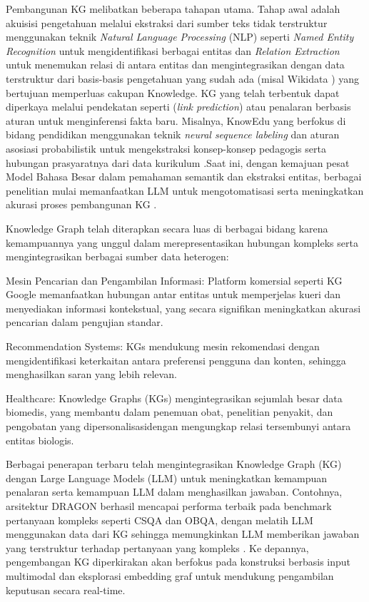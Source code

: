Pembangunan KG melibatkan beberapa tahapan utama. Tahap awal adalah akuisisi pengetahuan melalui ekstraksi dari sumber teks tidak terstruktur menggunakan teknik \textit{Natural Language Processing} (NLP) seperti \textit{Named Entity Recognition} untuk mengidentifikasi berbagai entitas dan \textit{Relation Extraction} untuk menemukan relasi di antara entitas dan mengintegrasikan dengan data terstruktur dari basis-basis pengetahuan yang sudah ada (misal Wikidata \cite{wikidata}) yang bertujuan memperluas cakupan Knowledge. KG yang telah terbentuk dapat diperkaya melalui pendekatan seperti (\textit{link prediction}) atau penalaran berbasis aturan untuk menginferensi fakta baru. Misalnya, KnowEdu yang berfokus di bidang pendidikan menggunakan teknik \textit{neural sequence labeling} dan aturan asosiasi probabilistik untuk mengekstraksi konsep-konsep pedagogis serta hubungan prasyaratnya dari data kurikulum \cite{knowedu}.Saat ini, dengan kemajuan pesat Model Bahasa Besar dalam pemahaman semantik dan ekstraksi entitas, berbagai penelitian mulai memanfaatkan LLM untuk mengotomatisasi serta meningkatkan akurasi proses pembangunan KG \cite{edge2025localglobalgraphrag}.
		
Knowledge Graph telah diterapkan secara luas di berbagai bidang karena kemampuannya yang unggul dalam merepresentasikan hubungan kompleks serta mengintegrasikan berbagai sumber data heterogen:  
\begin{daftar}
	\item Mesin Pencarian dan Pengambilan Informasi: Platform komersial seperti KG Google memanfaatkan hubungan antar entitas untuk memperjelas kueri dan menyediakan informasi kontekstual, yang secara signifikan meningkatkan akurasi pencarian dalam pengujian standar.  
	\item Recommendation Systems: KGs mendukung mesin rekomendasi dengan mengidentifikasi keterkaitan antara preferensi pengguna dan konten, sehingga menghasilkan saran yang lebih relevan.
	\item Healthcare: Knowledge Graphs (KGs) mengintegrasikan sejumlah besar data biomedis, yang membantu dalam penemuan obat, penelitian penyakit, dan pengobatan yang dipersonalisasidengan mengungkap relasi tersembunyi antara entitas biologis.
\end{daftar}

Berbagai penerapan terbaru telah mengintegrasikan Knowledge Graph (KG) dengan Large Language Models (LLM) untuk meningkatkan kemampuan penalaran serta kemampuan LLM dalam menghasilkan jawaban. Contohnya, arsitektur DRAGON \cite{yasunaga2022deepbidirectionallanguageknowledgegraph} berhasil mencapai performa terbaik pada benchmark pertanyaan kompleks seperti CSQA dan OBQA, dengan melatih LLM menggunakan data dari KG sehingga memungkinkan LLM memberikan jawaban yang terstruktur terhadap pertanyaan yang kompleks \cite{saha2018complexsequentialquestionanswering, mihaylov2018suitarmorconductelectricity}. Ke depannya, pengembangan KG diperkirakan akan berfokus pada konstruksi berbasis input multimodal dan eksplorasi embedding graf untuk mendukung pengambilan keputusan secara real-time.

